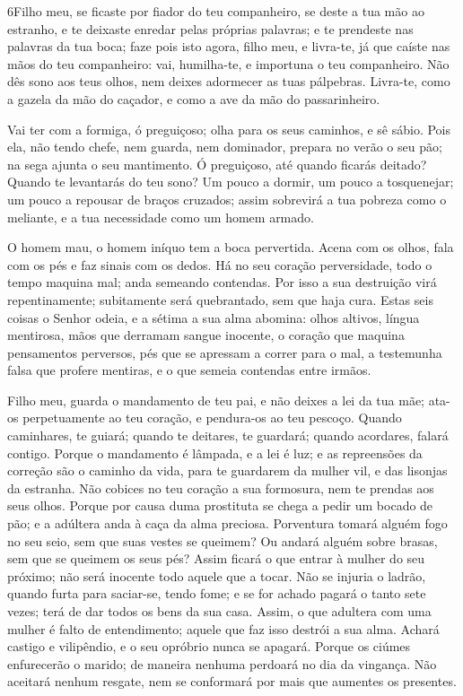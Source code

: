 \medskip

\lettrine{6}{}Filho meu, se ficaste por fiador do teu
companheiro, se deste a tua mão ao estranho, e te deixaste
enredar pelas próprias palavras; e te prendeste nas palavras da tua
boca; faze pois isto agora, filho meu, e livra-te, já que caíste
nas mãos do teu companheiro: vai, humilha-te, e importuna o teu
companheiro. Não dês sono aos teus olhos, nem deixes adormecer
as tuas pálpebras. Livra-te, como a gazela da mão do caçador, e
como a ave da mão do passarinheiro.

Vai ter com a formiga, ó preguiçoso; olha para os seus caminhos, e
sê sábio. Pois ela, não tendo chefe, nem guarda, nem dominador,
prepara no verão o seu pão; na sega ajunta o seu mantimento.
Ó preguiçoso, até quando ficarás deitado? Quando te levantarás
do teu sono? Um pouco a dormir, um pouco a tosquenejar; um
pouco a repousar de braços cruzados; assim sobrevirá a tua
pobreza como o meliante, e a tua necessidade como um homem armado.

O homem mau, o homem iníquo tem a boca pervertida. Acena
com os olhos, fala com os pés e faz sinais com os dedos. Há
no seu coração perversidade, todo o tempo maquina mal; anda semeando
contendas. Por isso a sua destruição virá repentinamente;
subitamente será quebrantado, sem que haja cura. Estas seis
coisas o Senhor odeia, e a sétima a sua alma abomina: olhos
altivos, língua mentirosa, mãos que derramam sangue inocente,
o coração que maquina pensamentos perversos, pés que se
apressam a correr para o mal, a testemunha falsa que profere
mentiras, e o que semeia contendas entre irmãos.

Filho meu, guarda o mandamento de teu pai, e não deixes a lei da
tua mãe; ata-os perpetuamente ao teu coração, e pendura-os ao
teu pescoço. Quando caminhares, te guiará; quando te
deitares, te guardará; quando acordares, falará contigo.
Porque o mandamento é lâmpada, e a lei é luz; e as
repreensões da correção são o caminho da vida, para te
guardarem da mulher vil, e das lisonjas da estranha. Não
cobices no teu coração a sua formosura, nem te prendas aos seus
olhos. Porque por causa duma prostituta se chega a pedir um
bocado de pão; e a adúltera anda à caça da alma preciosa.
Porventura tomará alguém fogo no seu seio, sem que suas
vestes se queimem? Ou andará alguém sobre brasas, sem que se
queimem os seus pés? Assim ficará o que entrar à mulher do
seu próximo; não será inocente todo aquele que a tocar. Não
se injuria o ladrão, quando furta para saciar-se, tendo fome;
e se for achado pagará o tanto sete vezes; terá de dar todos
os bens da sua casa. Assim, o que adultera com uma mulher é
falto de entendimento; aquele que faz isso destrói a sua alma.
Achará castigo e vilipêndio, e o seu opróbrio nunca se
apagará. Porque os ciúmes enfurecerão o marido; de maneira
nenhuma perdoará no dia da vingança. Não aceitará nenhum
resgate, nem se conformará por mais que aumentes os presentes.

